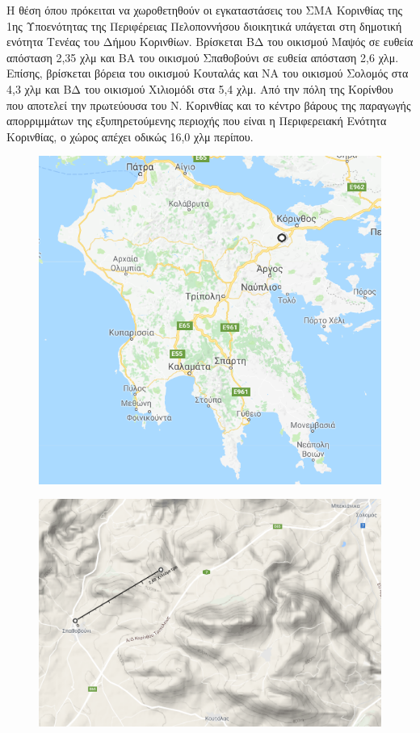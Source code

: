 \documentclass[12pt]{article}
\begin{document}
	Η θέση όπου πρόκειται να χωροθετηθούν οι εγκαταστάσεις του ΣΜΑ Κορινθίας της 1ης  Υποενότητας της Περιφέρειας Πελοποννήσου διοικητικά υπάγεται στη δημοτική ενότητα Τενέας του Δήμου Κορινθίων. Βρίσκεται ΒΔ του οικισμού Μαψός σε ευθεία απόσταση 2,35 χλμ και ΒΑ του οικισμού Σπαθοβούνι σε ευθεία απόσταση 2,6 χλμ. Επίσης, βρίσκεται βόρεια του οικισμού Κουταλάς και ΝΑ του οικισμού Σολομός στα 4,3 χλμ και ΒΔ του οικισμού Χιλιομόδι στα 5,4 χλμ. Από την πόλη της Κορίνθου που αποτελεί την πρωτεύουσα του Ν. Κορινθίας και το κέντρο βάρους της παραγωγής απορριμμάτων της εξυπηρετούμενης περιοχής που είναι η Περιφερειακή Ενότητα Κορινθίας, ο χώρος απέχει οδικώς 16,0 χλμ περίπου.
	
	\begin{figure} [H]
		\begin{center}
			\includegraphics [scale = 0.55] {map11.png}
		\end{center}
	\end{figure}

	\begin{figure} [H]
		\begin{center}
			\includegraphics [scale = 0.40] {map12.png}
		\end{center}
	\end{figure}
\end{document}
